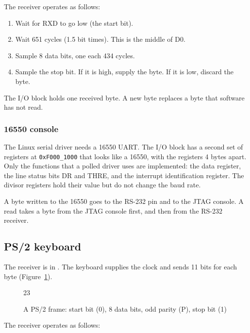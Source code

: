 The receiver operates as follows:

\begin{enumerate}
  \item Wait for RXD to go low (the start bit).
  \item Wait 651 cycles (1.5 bit times). This is the middle of D0.
  \item Sample 8 data bits, one each 434 cycles.
  \item Sample the stop bit. If it is high, supply the byte. If it is low, discard the byte.
\end{enumerate}

The I/O block holds one received byte. A new byte replaces a byte that software has not read.

\subsubsection{16550 console}
The Linux serial driver needs a 16550 UART. The I/O block has a second set of registers at \texttt{0xF000\_1000} that looks like a 16550, with the registers 4 bytes apart. Only the functions that a polled driver uses are implemented: the data register, the line status bits DR and THRE, and the interrupt identification register. The divisor registers hold their value but do not change the baud rate.

A byte written to the 16550 goes to the RS-232 pin and to the JTAG console. A read takes a byte from the JTAG console first, and then from the RS-232 receiver.

\subsection{PS/2 keyboard}

The receiver is in . The keyboard supplies the clock and sends 11 bits for each byte (Figure~\ref{fig:ps2}).

\begin{figure}[H]
  \centering
  \begin{waveform}[0.6cm]{23}
  \end{waveform}
  \caption{A PS/2 frame: start bit (0), 8 data bits, odd parity (P), stop bit (1)}
  \label{fig:ps2}
\end{figure}

The receiver operates as follows:

